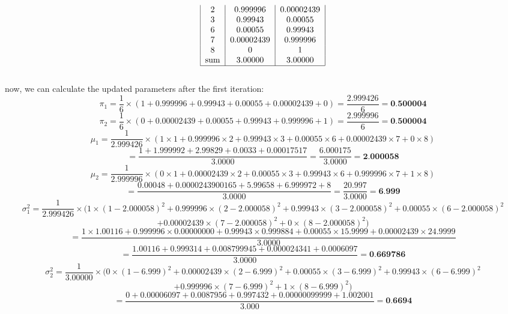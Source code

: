 \documentclass{article}
\begin{document}
\begin{enumerate}
\[\begin{tabular}{|c|c|c|c|c|c|c|c|}
2 & 0.999996 & 0.00002439 \\
3 & 0.99943 & 0.00055 \\
6 & 0.00055 & 0.99943 \\
7 & 0.00002439 & 0.999996 \\
8 & 0 & 1 \\
sum & 3.00000 & 3.00000 \\
\hline
\end{tabular}
\]
\\ now, we can calculate the updated parameters after the first iteration:
\[
\pi_1 = \frac{1}{6} \times (1 + 0.999996 + 0.99943 + 0.00055 + 0.00002439 + 0) = \frac{2.999426}{6} = \textbf{0.500004}
\]
\[
\pi_2 = \frac{1}{6} \times (0 + 0.00002439 + 0.00055 + 0.99943 + 0.999996 + 1) = \frac{2.999996}{6} = \textbf{0.500004}
\]
\[
\mu_1 = \frac{1}{2.999426} \times (1 \times 1 + 0.999996 \times 2 + 0.99943 \times 3 + 0.00055 \times 6 + 0.00002439 \times 7 + 0 \times 8) 
\]
\[
    = \frac{1 + 1.999992 + 2.99829 + 0.0033 + 0.00017517}{3.0000} = \frac{6.000175}{3.0000} = \textbf{2.000058}
\]
\[
\mu_2 = \frac{1}{2.999996} \times (0 \times 1 + 0.00002439 \times 2 + 0.00055 \times 3 + 0.99943 \times 6 + 0.999996 \times 7 + 1 \times 8)
\]
\[
= \frac{0.00048 + 0.0000243900165 + 5.99658 + 6.999972 + 8}{3.0000} = \frac{20.997}{3.0000} = \textbf{6.999}
\]
\[
\sigma_1^2 = \frac{1}{2.999426} \times (1 \times (1 - 2.000058)^2 + 0.999996 \times (2 - 2.000058)^2 + 0.99943 \times (3 - 2.000058)^2 + 0.00055 \times (6 - 2.000058)^2 
\]
\[
    + 0.00002439 \times (7 - 2.000058)^2 + 0 \times (8 - 2.000058)^2)
\]
\[
= \frac{1 \times 1.00116 + 0.999996 \times 0.00000000 + 0.99943 \times 0.999884 + 0.00055 \times 15.9999 + 0.00002439 \times 24.9999}{3.0000} 
\]
\[
    = \frac{1.00116 + 0.999314 + 0.008799945 + 0.000024341 + 0.0006097}{3.0000} = \textbf{0.669786}
\]
\[
\sigma_2^2 = \frac{1}{3.00000} \times (0 \times (1 - 6.999)^2 + 0.00002439 \times (2 - 6.999)^2 + 0.00055 \times (3 - 6.999)^2 + 0.99943 \times (6 - 6.999)^2
\]
\[
    + 0.999996 \times (7 - 6.999)^2 + 1 \times (8 - 6.999)^2)
\]
\[
= \frac{0 + 0.00006097 + 0.0087956 + 0.997432 + 0.00000099999 + 1.002001}{3.000} = \textbf{0.6694}
\]


\end{enumerate}
\end{document}

